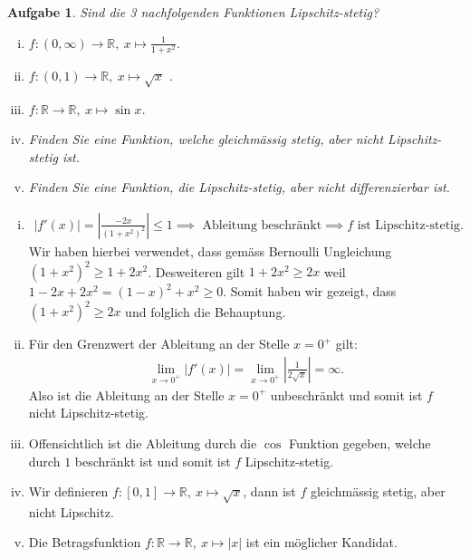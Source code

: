 \documentclass[a4paper, 20]{exam}
\newtheorem{ex}{Aufgabe}
\begin{document}
\begin{ex} Sind die 3 nachfolgenden Funktionen Lipschitz-stetig?
\begin{enumerate}[i)]
\item $f:(0, \infty) \longrightarrow \mathbb{R}, \ x \longmapsto \frac{1}{1+x^2}$.
\item $f:(0,1) \longrightarrow \mathbb{R}, \ x \longmapsto \sqrt{x}$ .
\item $f: \mathbb{R} \longrightarrow \mathbb{R}, \ x \longmapsto \sin x$.
\item Finden Sie eine Funktion, welche gleichmässig stetig, aber nicht Lipschitz-stetig ist.
\item Finden Sie eine Funktion, die Lipschitz-stetig, aber nicht differenzierbar ist.

\end{enumerate}

\end{ex}


\begin{solution} 
\begin{enumerate}[i)]

\item \begin{align*}
|f'(x)| = \left| \frac{-2x}{(1+x^2)^2}\right| \leq 1 \implies \text{ Ableitung beschränkt} \implies f \text{ ist Lipschitz-stetig}.
\end{align*}
Wir haben hierbei verwendet, dass gemäss Bernoulli Ungleichung $(1+x^2)^2 \geq 1 + 2x^2$. Desweiteren gilt $1+2x^2 \geq 2x$ weil $1-2x+2x^2 = (1-x)^2 + x^2 \geq 0$. Somit haben wir gezeigt, dass $(1+x^2)^2 \geq 2x$ und folglich die Behauptung. 
\item Für den Grenzwert der Ableitung an der Stelle $x=0^+$ gilt:
\begin{align*}
\lim_{x \rightarrow 0^+} |f'(x)| = \lim_{x \rightarrow 0^+} \left| \frac{1}{2 \sqrt{x}} \right| = \infty.
\end{align*}
Also ist die Ableitung an der Stelle $x=0^+$ unbeschränkt und somit ist $f$ nicht Lipschitz-stetig.
\item Offensichtlich ist die Ableitung durch die $\cos$ Funktion gegeben, welche durch $1$ beschränkt ist und somit ist $f$ Lipschitz-stetig.
\item Wir definieren $f: [0,1] \longrightarrow \mathbb{R}, \ x \longmapsto \sqrt{x}$, dann ist $f$ gleichmässig stetig, aber nicht Lipschitz.
\item Die Betragsfunktion $f: \mathbb{R} \longrightarrow \mathbb{R}, \ x \longmapsto |x|$ ist ein möglicher Kandidat. 
\end{enumerate}


\end{solution}
\end{document}

